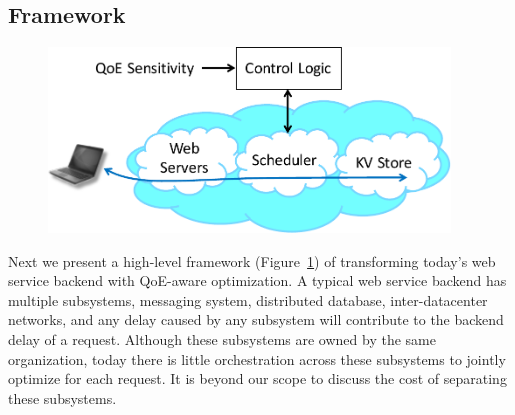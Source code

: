 \subsection{Framework}
\label{subsec:framework}
\begin{figure}
	\centering
	\includegraphics[width=0.95\textwidth]{figs/framework.pdf}
	\caption{}
	\label{fig:framework}
\end{figure}
Next we present a high-level framework (Figure~\ref{fig:framework}) of transforming today's web service backend with QoE-aware optimization.
A typical web service backend has multiple subsystems, \eg messaging system, distributed database, inter-datacenter networks, and any delay caused by any subsystem will contribute to the backend delay of a request.
Although these subsystems are owned by the same organization, today there is little orchestration across these subsystems to jointly optimize for each request. 
It is beyond our scope to discuss the cost of separating these subsystems. 



